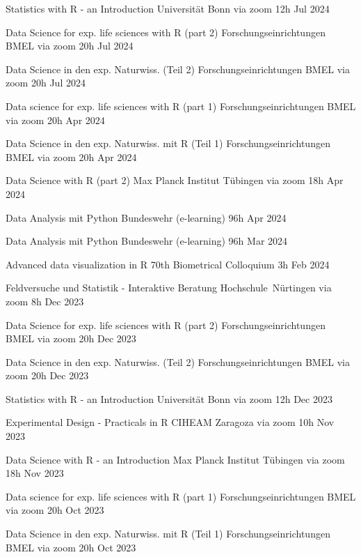 \documentclass[11pt,a4paper,]{awesome-cv}
\begin{document}
\begin{cvhonors} 
\cvhonor
{Statistics with R - an Introduction  }
{Universität Bonn via zoom}
{12h}
{Jul 2024  }

\cvhonor
{Data Science for exp. life sciences with R (part 2)  }
{Forschungseinrichtungen BMEL via zoom}
{20h}
{Jul 2024  }

\cvhonor
{Data Science in den exp. Naturwiss. (Teil 2)  }
{Forschungseinrichtungen BMEL via zoom}
{20h}
{Jul 2024  }

\cvhonor
{Data science for exp. life sciences with R (part 1)  }
{Forschungseinrichtungen BMEL via zoom}
{20h}
{Apr 2024  }

\cvhonor
{Data Science in den exp. Naturwiss. mit R (Teil 1)  }
{Forschungseinrichtungen BMEL via zoom}
{20h}
{Apr 2024  }

\cvhonor
{Data Science with R (part 2)  }
{Max Planck Institut Tübingen via zoom}
{18h}
{Apr 2024  }

\cvhonor
{Data Analysis mit Python  }
{Bundeswehr (e-learning)}
{96h}
{Apr 2024  }

\cvhonor
{Data Analysis mit Python  }
{Bundeswehr (e-learning)}
{96h}
{Mar 2024  }

\cvhonor
{Advanced data visualization in R  }
{70th Biometrical Colloquium}
{3h}
{Feb 2024  }

\cvhonor
{Feldversuche und Statistik - Interaktive Beratung  }
{Hochschule Nürtingen via zoom}
{8h}
{Dec 2023  }

\cvhonor
{Data Science for exp. life sciences with R (part 2)  }
{Forschungseinrichtungen BMEL via zoom}
{20h}
{Dec 2023  }

\cvhonor
{Data Science in den exp. Naturwiss. (Teil 2)  }
{Forschungseinrichtungen BMEL via zoom}
{20h}
{Dec 2023  }

\cvhonor
{Statistics with R - an Introduction  }
{Universität Bonn via zoom}
{12h}
{Dec 2023  }

\cvhonor
{Experimental Design - Practicals in R  }
{CIHEAM Zaragoza via zoom}
{10h}
{Nov 2023  }

\cvhonor
{Data Science with R - an Introduction  }
{Max Planck Institut Tübingen via zoom}
{18h}
{Nov 2023  }

\cvhonor
{Data science for exp. life sciences with R (part 1)  }
{Forschungseinrichtungen BMEL via zoom}
{20h}
{Oct 2023  }

\cvhonor
{Data Science in den exp. Naturwiss. mit R (Teil 1)  }
{Forschungseinrichtungen BMEL via zoom}
{20h}
{Oct 2023  }


\end{cvhonors}
\end{document}
